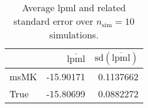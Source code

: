 \begin{table}[H]

\caption{Average lpml and related standard error over $n_{\text{sim}} = 10$ simulations.}
\centering
\begin{tabular}[t]{lrr}
\toprule
  & $\overbar{\text{lpml}}$ & $\text{sd}(\overbar{\text{lpml}})$\\
\midrule
msMK & -15.90171 & 0.1137662\\
True & -15.80699 & 0.0882272\\
\bottomrule
\end{tabular}
\end{table}